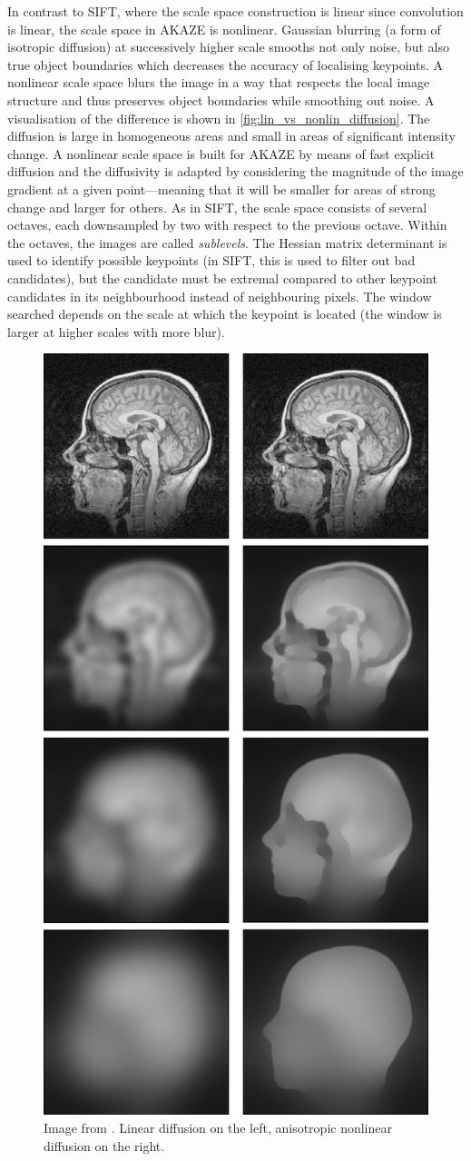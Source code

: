 In contrast to SIFT, where the scale space construction is linear since
convolution is linear, the scale space in AKAZE is nonlinear. Gaussian blurring
(a form of isotropic diffusion) at successively higher scale smooths not only
noise, but also true object boundaries which decreases the accuracy of
localising keypoints. A nonlinear scale space blurs the image in a way that
respects the local image structure and thus preserves object boundaries while
smoothing out noise. A visualisation of the difference is shown in
\autoref{fig:lin_vs_nonlin_diffusion}. The diffusion is large in homogeneous
areas and small in areas of significant intensity change.  A nonlinear scale
space is built for AKAZE by means of fast explicit diffusion
\citep{grewenig2010} and the diffusivity is adapted by considering the magnitude
of the image gradient at a given point---meaning that it will be smaller for
areas of strong change and larger for others. As in SIFT, the scale space
consists of several octaves, each downsampled by two with respect to the
previous octave. Within the octaves, the images are called \emph{sublevels}.
The Hessian matrix determinant is used to identify possible keypoints (in SIFT,
this is used to filter out bad candidates),  but the candidate must be extremal
compared to other keypoint candidates in its neighbourhood instead of
neighbouring pixels. The window searched depends on the scale at which the
keypoint is located (the window is larger at higher scales with more blur).

\begin{figure}[h]
   {\centering      
      \includegraphics[width=.5\textwidth]{gfx/lin_vs_nonlin_diffusion2.png}
      \caption[Linear vs. nonlinear diffusion]{Image from \citep[p.120,121]{weickert1998}. Linear diffusion on the left,
   anisotropic nonlinear diffusion on the right.}
   \label{fig:lin_vs_nonlin_diffusion}}
\end{figure}

